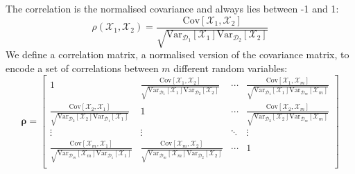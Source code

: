 \begin{definition}[Correlation]
The correlation is the normalised covariance and always lies between -1 and 1:
\[\rho(\mathcal{X}_1, \mathcal{X}_2) = \frac{\mbox{Cov}[\mathcal{X}_1, \mathcal{X}_2]}{\sqrt{\mbox{Var}_{\mathcal{D}_1}[\mathcal{X}_1] \mbox{Var}_{\mathcal{D}_2}[\mathcal{X}_2]}}\]
We define a correlation matrix, a normalised version of the covariance matrix,
to encode a set of correlations between $m$ different random variables:
\begin{equation*}
    \boldsymbol{\rho} =\begin{bmatrix}
    1 & \frac{\mbox{Cov}[\mathcal{X}_1, \mathcal{X}_2]}{\sqrt{\mbox{Var}_{\mathcal{D}_1}[\mathcal{X}_1] \mbox{Var}_{\mathcal{D}_2}[\mathcal{X}_2]}} & \cdots & \frac{\mbox{Cov}[\mathcal{X}_1, \mathcal{X}_m]}{\sqrt{\mbox{Var}_{\mathcal{D}_1}[\mathcal{X}_1] \mbox{Var}_{\mathcal{D}_m}[\mathcal{X}_m]}}\\
    \frac{\mbox{Cov}[\mathcal{X}_2, \mathcal{X}_1]}{\sqrt{\mbox{Var}_{\mathcal{D}_2}[\mathcal{X}_2] \mbox{Var}_{\mathcal{D}_1}[\mathcal{X}_1]}} & 1 & \cdots & \frac{\mbox{Cov}[\mathcal{X}_2, \mathcal{X}_m]}{\sqrt{\mbox{Var}_{\mathcal{D}_2}[\mathcal{X}_2] \mbox{Var}_{\mathcal{D}_m}[\mathcal{X}_m]}}\\
    \vdots & \vdots & \ddots & \vdots \\
    \frac{\mbox{Cov}[\mathcal{X}_m, \mathcal{X}_1]}{\sqrt{\mbox{Var}_{\mathcal{D}_m}[\mathcal{X}_m] \mbox{Var}_{\mathcal{D}_1}[\mathcal{X}_1]}} & \frac{\mbox{Cov}[\mathcal{X}_m, \mathcal{X}_2]}{\sqrt{\mbox{Var}_{\mathcal{D}_m}[\mathcal{X}_m] \mbox{Var}_{\mathcal{D}_2}[\mathcal{X}_2]}} & \cdots & 1\\
    \end{bmatrix}
\end{equation*}
\end{definition}
